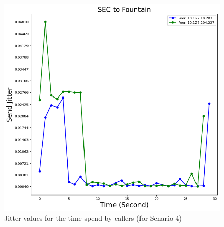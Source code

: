 	\begin{figure}[!b]
		\begin{minipage}{\textwidth}
			\includegraphics[scale=0.38]{Images/experiment/senarios/df_fountain.png}
		\end{minipage}
		\caption{Jitter values for the time spend by callers (for Senario 4)}
		\label{fig:scene-out-4}
	\end{figure}


